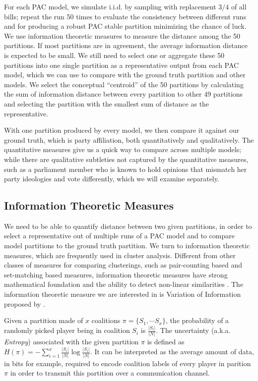 For each PAC model, we simulate i.i.d. by sampling with replacement $3/4$ of
all bills; repeat the run 50 times to evaluate the consistency between
different runs and for producing a robust PAC stable partition minimizing the
chance of luck.
We use information theoretic measures to measure the distance among the 50
partitions.
If most partitions are in agreement, the average information distance is
expected to be small.
We still need to select one or aggregate these 50 partitions into one single
partition as a representative output from each PAC model, which we can use
to compare with the ground truth partition and other models.
We select the conceptual ``centroid'' of the 50 partitions by calculating
the sum of information distance between every partition to other 49 partitions
and selecting the partition with the smallest sum of distance as the
representative.

With one partition produced by every model, we then compare it against our
ground truth, which is party affiliation, both quantitatively and qualitatively.
The quantitative measures give us a quick way to compare across multiple models;
while there are qualitative subtleties not captured by the quantitative
measures, such as a parliament member who is known to hold opinions that
mismatch her party ideologies and vote differently, which we will examine
separately.

\subsection{Information Theoretic Measures}
We need to be able to quantify distance between two given partitions, in order
to select a representative out of multiple runs of a PAC model and to compare
model partitions to the ground truth partition.
We turn to information theoretic measures, which are frequently used in cluster
analysis.
Different from other classes of measures for comparing clusterings, such as
pair-counting based and set-matching based measures, information theoretic
measures have strong mathematical foundation and the ability to detect
non-linear similarities \cite{Vinh:2010:ITM:1756006.1953024}.
The information theoretic measure we are interested in is Variation of
Information proposed by .

Given a partition made of $x$ coalitions $\pi = \{S_1, \cdots S_x\}$, the
probability of a randomly picked player being in coalition $S_i$ is
$\frac{|S_i|}{|N|}$.
The uncertainty (a.k.a. \textit{Entropy}) associated with the given partition
$\pi$ is defined as
$H(\pi) = - \sum^x_{i=1} \frac{|S_i|}{|N|} \log{\frac{|S_i|}{|N|}}$.
It can be interpreted as the average amount of data, in bits for example,
required to encode coalition labels of every player in parition $\pi$ in order
to transmit this partition over a communication channel.


